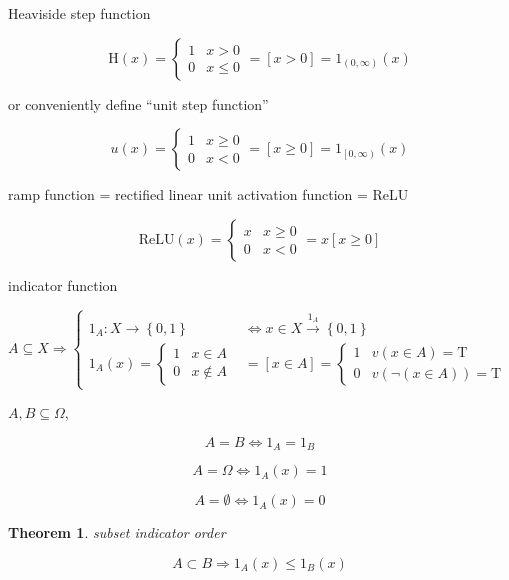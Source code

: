 \documentclass[
]{book}
\newtheorem{theorem}{Theorem}[chapter]
\theoremstyle{definition}
\theoremstyle{definition}
\theoremstyle{definition}
\theoremstyle{definition}
\theoremstyle{remark}
\begin{document}
Heaviside step function

\[
\mathrm{H}\left(x\right)=\begin{cases}
1 & x>0\\
0 & x\le0
\end{cases}=\left[x>0\right]=1_{\left(0,\infty\right)}\left(x\right)
\]

or conveniently define ``unit step function''

\[
u\left(x\right)=\begin{cases}
1 & x\ge0\\
0 & x<0
\end{cases}=\left[x\ge0\right]=1_{\left[0,\infty\right)}\left(x\right)
\]

ramp function = rectified linear unit activation function = ReLU

\[
\mathrm{ReLU}\left(x\right)=\begin{cases}
x & x\ge0\\
0 & x<0
\end{cases}=x\left[x\ge0\right]
\]

indicator function

\[
A\subseteq X\Rightarrow\begin{cases}
1_{A}:X\rightarrow\left\{ 0,1\right\}  & \Leftrightarrow x\in X\overset{1_{A}}{\rightarrow}\left\{ 0,1\right\} \\
1_{A}\left(x\right)=\begin{cases}
1 & x\in A\\
0 & x\notin A
\end{cases} & =\left[x\in A\right]=\begin{cases}
1 & v\left(x\in A\right)=\mathrm{T}\\
0 & v\left(\neg\left(x\in A\right)\right)=\mathrm{T}
\end{cases}
\end{cases}
\]

\(A,B\subseteq\Omega\),

\[
A=B\Leftrightarrow1_{A}=1_{B}
\]

\[
A=\Omega\Leftrightarrow1_{A}\left(x\right)=1
\]

\[
A=\emptyset\Leftrightarrow1_{A}\left(x\right)=0
\]

\begin{theorem}
\protect\hypertarget{thm:unnamed-chunk-24}{}\label{thm:unnamed-chunk-24}subset indicator order
\end{theorem}

\[
A\subset B\Rightarrow1_{A}\left(x\right)\le1_{B}\left(x\right)
\]
\end{document}
